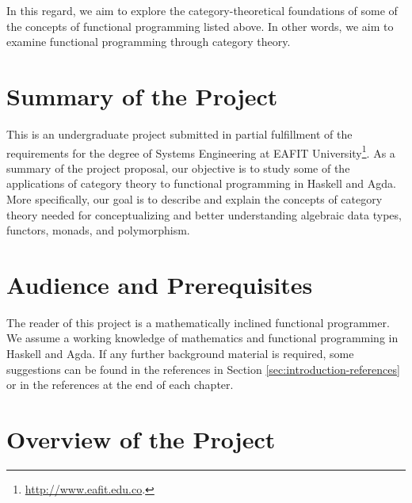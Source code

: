 In this regard, we aim to explore the category-theoretical foundations
of some of the concepts of functional programming listed above. In
other words, we aim to examine functional programming through category
theory.

\section{Summary of the Project}
\label{sec:introduction-summary}

This is an undergraduate project submitted in partial fulfillment of
the requirements for the degree of Systems Engineering at EAFIT
University\footnote{\url{http://www.eafit.edu.co}.}. As a summary of
the project proposal, our objective is to study some of the
applications of category theory to functional programming in Haskell
and Agda. More specifically, our goal is to describe and explain the
concepts of category theory needed for conceptualizing and better
understanding algebraic data types, functors, monads, and
polymorphism.

\section{Audience and Prerequisites}
\label{sec:introduction-prerequisites}

The reader of this project is a mathematically inclined functional
programmer. We assume a working knowledge of mathematics and
functional programming in Haskell and Agda. If any further background
material is required, some suggestions can be found in the references
in Section \ref{sec:introduction-references} or in the references at
the end of each chapter.

\section{Overview of the Project}
\label{sec:introduction-overview}


